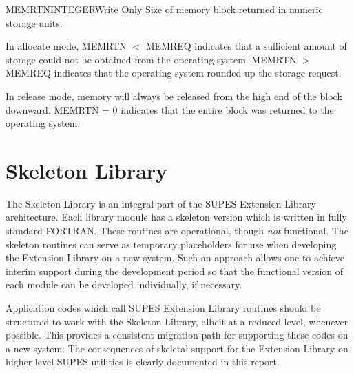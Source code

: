 \begin{argy}{MEMRTN}{INTEGER}{Write Only}
Size of memory block returned in numeric storage units.
\end{argy}

In allocate mode, MEMRTN $<$ MEMREQ indicates that a sufficient amount of
storage could not be obtained from the operating system.  MEMRTN $>$ MEMREQ
indicates that the operating system rounded up the storage request.

In release mode, memory will always be released from the high end of the
block downward.  MEMRTN = 0 indicates that the entire block was returned to
the operating system.


\section{Skeleton Library} \label{sec:skel}
The Skeleton Library is an integral part of the SUPES Extension Library
architecture.  Each library module has a skeleton version which is written
in fully standard FORTRAN.  These routines are operational, though {\em not}
functional.  The skeleton routines can serve as temporary
placeholders for use when developing
the Extension Library on a new system.
Such an approach allows one to achieve
interim support during the development period so that the functional version
of each module can be developed individually, if necessary.

Application codes which call SUPES Extension Library routines should be
structured to work with the Skeleton Library, albeit at a reduced level,
whenever possible.  This provides a consistent migration path for supporting
these codes on a new system.  The consequences of skeletal support for the
Extension Library on higher level SUPES utilities is clearly documented in
this report.


